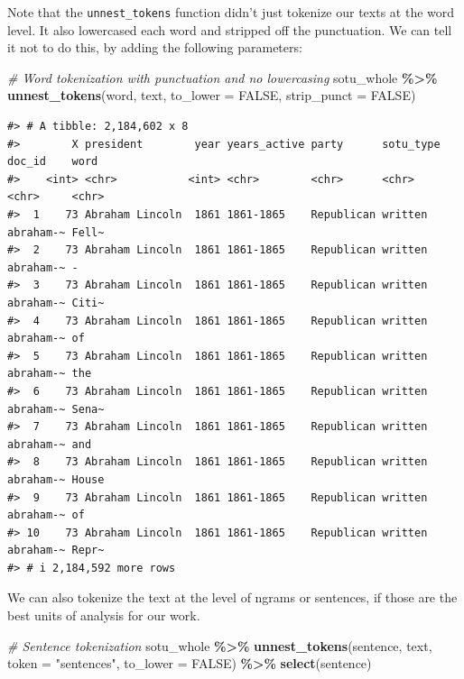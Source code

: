 \documentclass[
]{book}
\newenvironment{Shaded}{\begin{snugshade}}{\end{snugshade}}
\newcommand{\AttributeTok}[1]{\textcolor[rgb]{0.13,0.29,0.53}{#1}}
\newcommand{\CommentTok}[1]{\textcolor[rgb]{0.56,0.35,0.01}{\textit{#1}}}
\newcommand{\ConstantTok}[1]{\textcolor[rgb]{0.56,0.35,0.01}{#1}}
\newcommand{\FunctionTok}[1]{\textcolor[rgb]{0.13,0.29,0.53}{\textbf{#1}}}
\newcommand{\NormalTok}[1]{#1}
\newcommand{\SpecialCharTok}[1]{\textcolor[rgb]{0.81,0.36,0.00}{\textbf{#1}}}
\newcommand{\StringTok}[1]{\textcolor[rgb]{0.31,0.60,0.02}{#1}}
\begin{document}
Note that the \texttt{unnest\_tokens} function didn't just tokenize our texts at the word level. It also lowercased each word and stripped off the punctuation. We can tell it not to do this, by adding the following parameters:

\begin{Shaded}
\begin{Highlighting}[]
\CommentTok{\# Word tokenization with punctuation and no lowercasing}
\NormalTok{sotu\_whole }\SpecialCharTok{\%\textgreater{}\%}
  \FunctionTok{unnest\_tokens}\NormalTok{(word, text, }\AttributeTok{to\_lower =} \ConstantTok{FALSE}\NormalTok{, }\AttributeTok{strip\_punct =} \ConstantTok{FALSE}\NormalTok{)}
\end{Highlighting}
\end{Shaded}

\begin{verbatim}
#> # A tibble: 2,184,602 x 8
#>        X president        year years_active party      sotu_type doc_id    word 
#>    <int> <chr>           <int> <chr>        <chr>      <chr>     <chr>     <chr>
#>  1    73 Abraham Lincoln  1861 1861-1865    Republican written   abraham-~ Fell~
#>  2    73 Abraham Lincoln  1861 1861-1865    Republican written   abraham-~ -    
#>  3    73 Abraham Lincoln  1861 1861-1865    Republican written   abraham-~ Citi~
#>  4    73 Abraham Lincoln  1861 1861-1865    Republican written   abraham-~ of   
#>  5    73 Abraham Lincoln  1861 1861-1865    Republican written   abraham-~ the  
#>  6    73 Abraham Lincoln  1861 1861-1865    Republican written   abraham-~ Sena~
#>  7    73 Abraham Lincoln  1861 1861-1865    Republican written   abraham-~ and  
#>  8    73 Abraham Lincoln  1861 1861-1865    Republican written   abraham-~ House
#>  9    73 Abraham Lincoln  1861 1861-1865    Republican written   abraham-~ of   
#> 10    73 Abraham Lincoln  1861 1861-1865    Republican written   abraham-~ Repr~
#> # i 2,184,592 more rows
\end{verbatim}

We can also tokenize the text at the level of ngrams or sentences, if those are the best units of analysis for our work.

\begin{Shaded}
\begin{Highlighting}[]
\CommentTok{\# Sentence tokenization}
\NormalTok{sotu\_whole }\SpecialCharTok{\%\textgreater{}\%}
  \FunctionTok{unnest\_tokens}\NormalTok{(sentence, text, }\AttributeTok{token =} \StringTok{"sentences"}\NormalTok{, }\AttributeTok{to\_lower =} \ConstantTok{FALSE}\NormalTok{) }\SpecialCharTok{\%\textgreater{}\%} 
  \FunctionTok{select}\NormalTok{(sentence)}
\end{Highlighting}
\end{Shaded}
\end{document}
